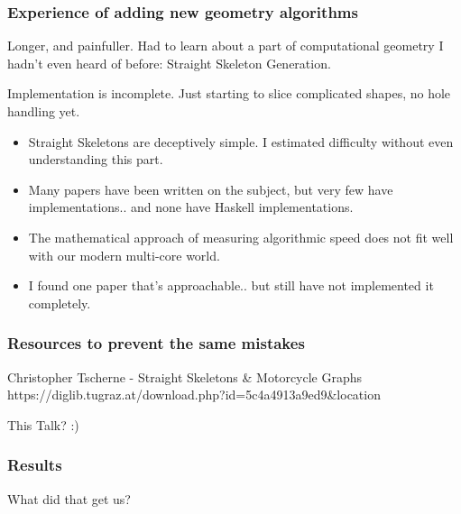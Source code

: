 \documentclass[hyperref={pdfpagemode=FullScreen},aspectratio=169]{beamer}
\begin{document}
\begin{frame}
  \frametitle{Experience of adding new geometry algorithms}
  Longer, and painfuller. Had to learn about a part of computational geometry I hadn't even heard of before: Straight Skeleton Generation.\par
  Implementation is incomplete. Just starting to slice complicated shapes, no hole handling yet.
  \begin{itemize}
  \item Straight Skeletons are deceptively simple. I estimated difficulty without even understanding this part.
  \item Many papers have been written on the subject, but very few have implementations.. and none have Haskell implementations.
  \item The mathematical approach of measuring algorithmic speed does not fit well with our modern multi-core world.
  \item I found one paper that's approachable.. but still have not implemented it completely.
  \end{itemize}
\end{frame}

\begin{frame}
  \frametitle{Resources to prevent the same mistakes}
  \begin{block}{Christopher Tscherne - Straight Skeletons \& Motorcycle Graphs}
    https://diglib.tugraz.at/download.php?id=5c4a4913a9ed9\&location
  \end{block}
  This Talk? :)
\end{frame}

\begin{frame}
  \frametitle{Results}
  \Huge{\centerline{What did that get us?}}
\end{frame}
\end{document}
